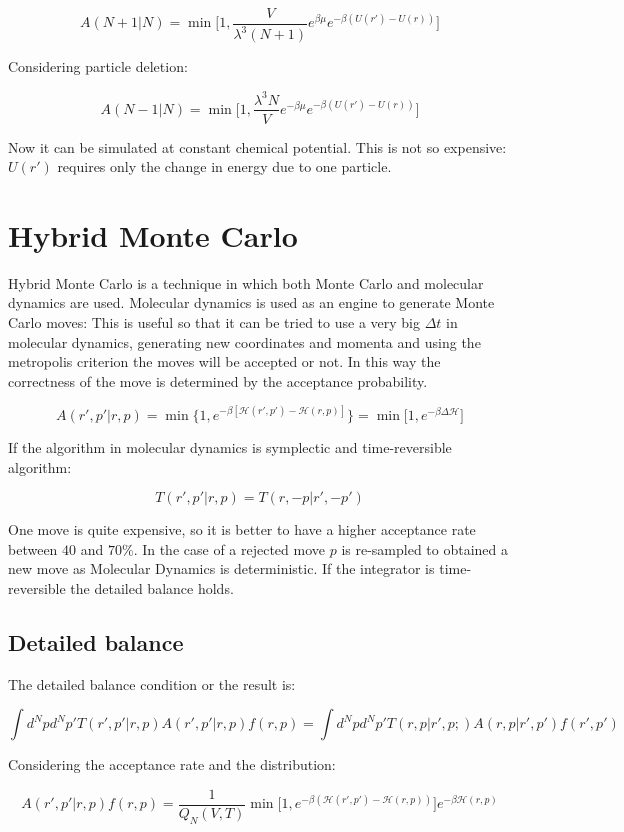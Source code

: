 	$$A(N+1|N) = \min\biggl[1, \frac{V}{\lambda^3(N+1)}e^{\beta\mu}e^{-\beta(U(r')-U(r))}\biggr]$$

	Considering particle deletion:

	$$A(N-1|N) = \min\biggl[1, \frac{\lambda^3N}{V}e^{-\beta\mu}e^{-\beta(U(r')-U(r))}\biggr]$$

	Now it can be simulated at constant chemical potential.
	This is not so expensive: $U(r')$ requires only the change in energy due to one particle.

\section{Hybrid Monte Carlo}
Hybrid Monte Carlo is a technique in which both Monte Carlo and molecular dynamics are used.
Molecular dynamics is used as an engine to generate Monte Carlo moves:
This is useful so that it can be tried to use a very big $\Delta t$ in molecular dynamics, generating new coordinates and momenta and using the metropolis criterion the moves will be accepted or not.
In this way the correctness of the move is determined by the acceptance probability.

$$A(r', p' | r, p) = \min\{1, e^{-\beta[\mathcal{H}(r', p')-\mathcal{H}(r, p)]}\} = \min\bigl[1,e^{-\beta\Delta\mathcal{H}}\bigr]$$

If the algorithm in molecular dynamics is symplectic and time-reversible algorithm:

$$T(r', p'|r, p) = T(r, -p|r', -p')$$

One move is quite expensive, so it is better to have a higher acceptance rate between $40$ and $70\%$.
In the case of a rejected move $p$ is re-sampled to obtained a new move as Molecular Dynamics is deterministic.
If the integrator is time-reversible the detailed balance holds.

	\subsection{Detailed balance}
	The detailed balance condition or the result is:

	$$\int d^Npd^Np' T(r',p'|r,p)A(r',p'|r,p)f(r,p) = \int d^Npd^Np'T(r, p|r',p;)A(r,p|r',p')f(r',p')$$

	Considering the acceptance rate and the distribution:

	$$A(r',p'|r,p)f(r,p) = \frac{1}{Q_N(V, T)}\min\bigl[1, e^{-\beta(\mathcal{H}(r', p')-\mathcal{H}(r,p))}\bigr]e^{-\beta\mathcal{H}(r, p)}$$

